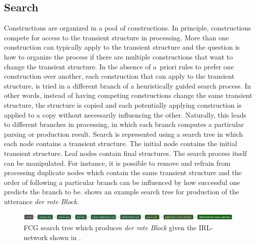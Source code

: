 \subsection{Search}
Constructions are organized in a pool of constructions. In principle, constructions compete for access 
to the transient structure in processing. More than one construction 
can typically apply to the transient structure and the question is how to organize
the process if there are multiple constructions that want to change
the transient structure. In the absence of a~priori rules to 
prefer one construction over another, each construction that can 
apply to the transient structure, is tried in a different branch of a 
heuristically guided search process. In other words, instead
of having competing constructions change the same transient
structure, the structure is copied and each potentially
applying construction is applied to a copy without necessarily 
influencing the other. Naturally, this leads to different
branches in processing, in which each branch
computes a particular parsing or production result.
Search is represented using a search tree in which each
node contains a transient structure. The initial node 
contains the initial transient structure. Leaf nodes contain final structures.
The search process itself can be manipulated. 
For instance, it is possible to remove and refrain from processing 
duplicate nodes which contain the same transient structure
and the order of following a particular branch can be 
influenced by how successful one predicts the branch to be.
 shows an example search tree for 
production of the utterance \textit{der rote Block}.

\begin{figure}
\begin{center}
\includegraphics[width=1.0\columnwidth]{figs/der-rote-block-fcg-search}
\end{center}
\caption[FCG search tree in production]{FCG search tree which 
produces \textit{der rote Block} given the IRL-network
shown in .}
\label{f:fcg-search}
\end{figure}


